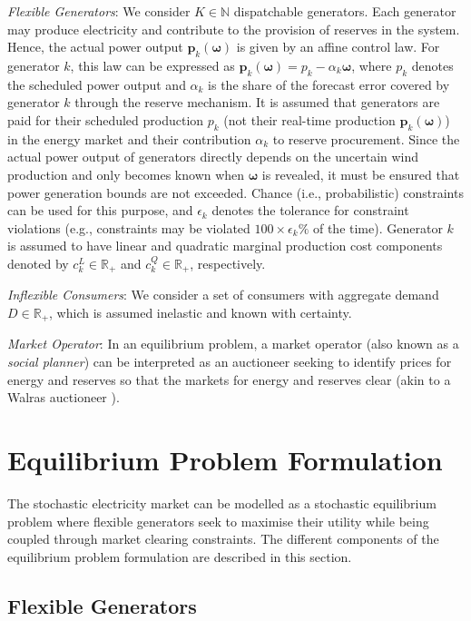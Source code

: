 \documentclass{article}
\begin{document}
\textit{Flexible Generators}: We consider $K \in \mathbb{N}$ dispatchable generators. Each generator may produce electricity and contribute to the provision of reserves in the system. Hence, the actual power output $\mathbf{p}_k(\boldsymbol{\omega})$ is given by an affine control law. For generator $k$, this law can be expressed as $\mathbf{p}_k(\boldsymbol{\omega}) = p_k - \alpha_k \boldsymbol{\omega}$, where $p_k$ denotes the scheduled power output and $\alpha_k$ is the share of the forecast error covered by generator $k$ through the reserve mechanism. It is assumed that generators are paid for their scheduled production $p_k$ (not their real-time production $\mathbf{p}_k(\boldsymbol{\omega})$) in the energy market and their contribution $\alpha_k$ to reserve procurement. Since the actual power output of generators directly depends on the uncertain wind production and only becomes known when $\boldsymbol{\omega}$ is revealed, it must be ensured that power generation bounds are not exceeded. Chance (i.e., probabilistic) constraints can be used for this purpose, and $\epsilon_k$ denotes the tolerance for constraint violations (e.g., constraints may be violated $100 \times \epsilon_k \%$ of the time). Generator $k$ is assumed to have linear and quadratic marginal production cost components denoted by $c_k^L \in \mathbb{R}_+$ and $c_k^Q \in \mathbb{R}_+$, respectively.

\textit{Inflexible Consumers}: We consider a set of consumers with aggregate demand $D \in \mathbb{R}_+$, which is assumed inelastic and known with certainty.

\textit{Market Operator}: In an equilibrium problem, a market operator (also known as a \textit{social planner}) can be interpreted as an auctioneer seeking to identify prices for energy and reserves so that the markets for energy and reserves clear (akin to a Walras auctioneer \cite{Uzawa1960}). 

\section{Equilibrium Problem Formulation}

The stochastic electricity market can be modelled as a stochastic equilibrium problem where flexible generators seek to maximise their utility while being coupled through market clearing constraints. The different components of the equilibrium problem formulation are described in this section. 

\subsection{Flexible Generators}
\end{document}
